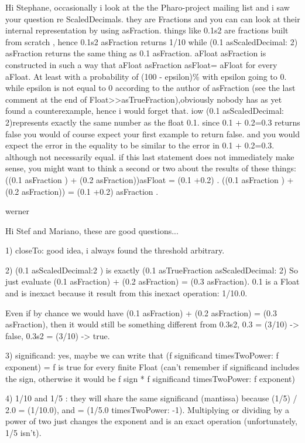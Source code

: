 \documentclass[a4paper,10pt,twoside]{book}
\begin{document}
Hi Stephane,
occasionally i look at the the Pharo-project mailing list and i saw your question re ScaledDecimals. they are Fractions and you can can look at their internal representation by using asFraction. things like 0.1s2 are fractions built from scratch , hence 0.1s2 asFraction returns 1/10 while (0.1 asScaledDecimal: 2) asFraction returns the same thing as 0.1 asFraction.
aFloat asFraction is constructed in such a way that
aFloat asFraction asFloat= aFloat
for every aFloat. At least with a probability of (100 - epsilon)\% with epsilon going to 0. while epsilon is not equal to 0 according to the author of asFraction (see the last comment at the end of Float>>asTrueFraction),obviously nobody has as yet found a counterexample, hence i would forget that.
iow (0.1 asScaledDecimal: 2)represents exactly the same number as the float 0.1.
since 0.1 + 0.2=0.3 returns false  you would of course expect your first example to return false. and you would expect the error in the equality to be similar to the error in 0.1 + 0.2=0.3. although not necessarily equal. if this last statement does not immediately make sense, you might want to think a second or two about the results of these things:
((0.1 asFraction ) + (0.2 asFraction))asFloat  = (0.1 +0.2) .
((0.1 asFraction ) + (0.2 asFraction))   = (0.1 +0.2) asFraction .

werner

Hi Stef and Mariano,
these are good questions...

1) closeTo: good idea, i always found the threshold arbitrary.

2) (0.1 asScaledDecimal:2 ) is exactly (0.1 asTrueFraction asScaledDecimal: 2)
So just evaluate (0.1 asFraction) + (0.2 asFraction) = (0.3 asFraction).
0.1 is a Float and is inexact because it result from this inexact
operation: 1/10.0.

Even if by chance we would have  (0.1 asFraction) + (0.2 asFraction) =
(0.3 asFraction), then it would still be something different from
0.3s2, 0.3 = (3/10) -> false, 0.3s2 = (3/10) -> true.

3) significand: yes, maybe we can write that (f significand
timesTwoPower: f exponent) = f is true for every finite Float (can't
remember if significand includes the sign, otherwise it would be f
sign * f significand timesTwoPower: f exponent)

4) 1/10 and 1/5 : they will share the same significand (mantissa)
because (1/5) / 2.0 = (1/10.0), and = (1/5.0 timesTwoPower: -1).
Multiplying or dividing by a power of two just changes the exponent
and is an exact operation (unfortunately, 1/5 isn't).
\end{document}
